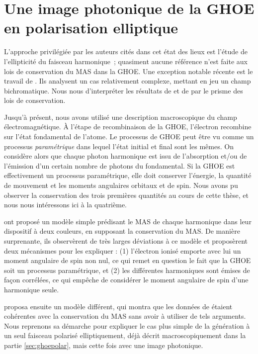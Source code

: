 \section{Une image photonique de la GHOE en polarisation elliptique}
L'approche privilégiée par les auteurs cités dans cet état des lieux est l'étude de l'ellipticité du faisceau harmonique~; quasiment aucune référence n'est faite aux lois de conservation du MAS dans la GHOE. Une exception notable récente est le travail de . Ils analysent un cas relativement complexe, mettant en jeu un champ bichromatique. Nous nous d'interpréter les résultats de  et de  par le prisme des lois de conservation.

Jusqu'à présent, nous avons utilisé une description macroscopique du champ électromagnétique. \`A l'étape de recombinaison de la GHOE, l'électron recombine sur l'état fondamental de l'atome. Le processus de GHOE peut être vu comme un processus \textit{paramétrique} dans lequel l'état initial et final sont les mêmes. On considère alors que chaque photon harmonique est issu de l'absorption et/ou de l'émission d'un certain nombre de photons du fondamental. Si la GHOE est effectivement un processus paramétrique, elle doit conserver l'énergie, la quantité de mouvement et les moments angulaires orbitaux et de spin. Nous avons pu observer la conservation des trois premières quantités au cours de cette thèse, et nous nous intéressons ici à la quatrième.

 ont proposé un modèle simple prédisant le MAS de chaque harmonique dans leur dispositif à deux couleurs, en supposant la conservation du MAS. De manière surprenante, ils observèrent de très larges déviations à ce modèle et proposèrent deux mécanismes pour les expliquer : (1) l'électron ionisé emporte avec lui un moment angulaire de spin non nul, ce qui remet en question le fait que la GHOE soit un processus paramétrique, et (2) les différentes harmoniques sont émises de façon corrélées, ce qui empêche de considérer le moment angulaire de spin d'une harmonique seule.\par
{} proposa ensuite un modèle différent, qui montra que les données de  étaient cohérentes avec la conservation du MAS sans avoir à utiliser de tels arguments. Nous reprenons sa démarche pour expliquer le cas plus simple de la génération à un seul faisceau polarisé elliptiquement, déjà décrit macroscopiquement dans la partie \ref{sec:ghoepolar}, mais cette fois avec une image photonique.


